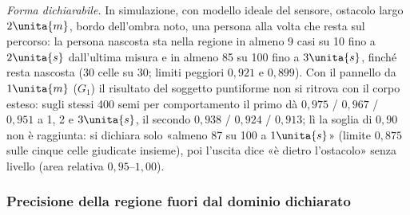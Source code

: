 \emph{Forma dichiarabile.} In simulazione, con modello ideale del sensore, ostacolo largo $2\unita{m}$, bordo dell'ombra noto, una persona alla volta che resta sul percorso: la persona nascosta sta nella regione in almeno 9 casi su 10 fino a $2\unita{s}$ dall'ultima misura e in almeno 85 su 100 fino a $3\unita{s}$, finché resta nascosta (30 celle su 30; limiti peggiori $0{,}921$ e $0{,}899$). Con il pannello da $1\unita{m}$ ($G_1$) il risultato del soggetto puntiforme non si ritrova con il corpo esteso: sugli stessi 400 semi per comportamento il primo dà $0{,}975$ / $0{,}967$ / $0{,}951$ a 1, 2 e $3\unita{s}$, il secondo $0{,}938$ / $0{,}924$ / $0{,}913$; lì la soglia di $0{,}90$ non è raggiunta: si dichiara solo «almeno 87 su 100 a $1\unita{s}$» (limite $0{,}875$ sulle cinque celle giudicate insieme), poi l'uscita dice «è dietro l'ostacolo» senza livello (area relativa $0{,}95$–$1{,}00$).

\subsubsection*{Precisione della regione fuori dal dominio dichiarato}

